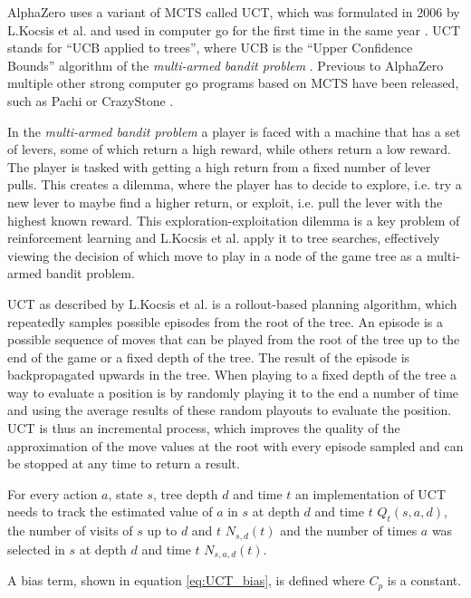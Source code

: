 \documentclass[12pt,onecolumn,oneside,titlepage]{article}
\begin{document}
AlphaZero uses a variant of MCTS called UCT, which was formulated in 2006 \cite{kocsis2006bandit} by L.Kocsis et al. and used in computer go for the first time in the same year \cite{gelly2006modification}.
UCT stands for ``UCB applied to trees'', where UCB is the ``Upper Confidence Bounds'' algorithm of the \emph{multi-armed bandit problem} \cite{auer2002finite}. 
Previous to AlphaZero multiple other strong computer go programs based on MCTS have been released, such as Pachi \cite{pachi_github} or CrazyStone \cite{crazystone}.


In the \emph{multi-armed bandit problem} a player is faced with a machine that has a set of levers, some of which return a high reward, while others return a low reward. The player is tasked with getting a high return from a fixed number of lever pulls.
This creates a dilemma, where the player has to decide to explore, i.e. try a new lever to maybe find a higher return, or exploit, i.e. pull the lever with the highest known reward. This exploration-exploitation dilemma is a key problem of reinforcement learning
and L.Kocsis et al. \cite{kocsis2006bandit} apply it to tree searches, effectively viewing the decision of which move to play in a node of the game tree as a multi-armed bandit problem.

UCT as described by L.Kocsis et al. is a rollout-based planning algorithm, which repeatedly samples possible episodes from the root of the tree. An episode is a possible sequence of moves that can be played from the root of the tree up to the end of the game or a fixed depth of the tree. The result
of the episode is backpropagated upwards in the tree. When playing to a fixed depth of the tree a way to evaluate a position is by randomly playing it to the end a number of time and using the average results of these random playouts to evaluate the position.
UCT is thus an incremental process, which improves the quality of the approximation of the move values at the root with every episode sampled and can be stopped at any time to return a result.

For every action $a$, state $s$, tree depth $d$ and time $t$ an implementation of UCT needs to track the estimated value of $a$ in $s$ at depth $d$ and time $t$ $Q_t(s,a,d)$, the number of visits of $s$ up to $d$ and $t$ $N_{s,d}(t)$ and the number of times
$a$ was selected in $s$ at depth $d$ and time $t$ $N_{s,a,d}(t)$.

A bias term, shown in equation \ref{eq:UCT_bias}, is defined where $C_p$ is a constant.
\end{document}

